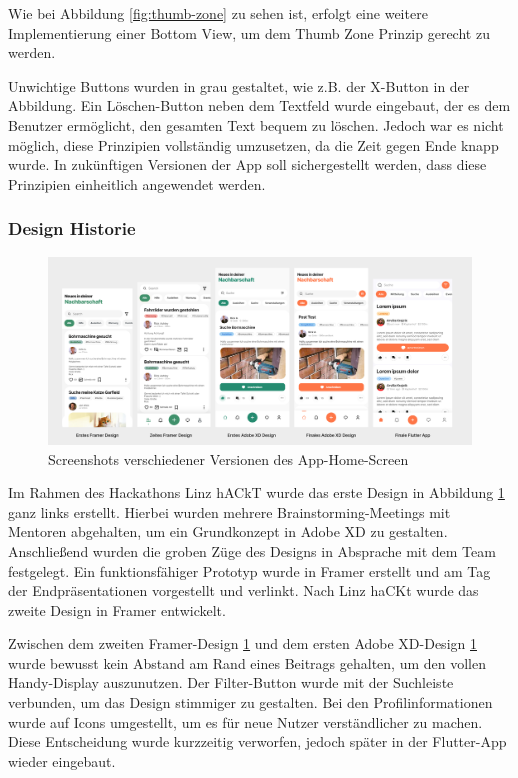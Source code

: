 Wie bei Abbildung \ref{fig:thumb-zone} zu sehen ist, erfolgt eine weitere Implementierung einer Bottom View, um dem Thumb Zone Prinzip gerecht zu werden.

Unwichtige Buttons wurden in grau gestaltet, wie z.B. der X-Button in der Abbildung. Ein Löschen-Button neben dem Textfeld wurde eingebaut, der es dem Benutzer ermöglicht, den gesamten Text bequem zu löschen. Jedoch war es nicht möglich, diese Prinzipien vollständig umzusetzen, da die Zeit gegen Ende knapp wurde. In zukünftigen Versionen der App soll sichergestellt werden, dass diese Prinzipien einheitlich angewendet werden.
\subsubsection{Design Historie}

\begin{figure}[h]
  \centering
  \includegraphics[width=1\textwidth]{pics/app-design-history.png}
  \caption{Screenshots verschiedener Versionen des App-Home-Screen}
  \label{fig:app-design-history}
\end{figure}
Im Rahmen des Hackathons Linz hACkT wurde das erste Design in Abbildung \ref{fig:app-design-history} ganz links erstellt. Hierbei wurden mehrere Brainstorming-Meetings mit Mentoren abgehalten, um ein Grundkonzept in Adobe XD zu gestalten. Anschließend wurden die groben Züge des Designs in Absprache mit dem Team festgelegt. Ein funktionsfähiger Prototyp wurde in Framer erstellt und am Tag der Endpräsentationen vorgestellt und verlinkt. Nach Linz haCKt wurde das zweite Design in Framer entwickelt.

Zwischen dem zweiten Framer-Design
\ref{fig:app-design-history} und dem ersten Adobe XD-Design
\ref{fig:app-design-history} wurde bewusst kein Abstand am
Rand eines Beitrags gehalten, um den vollen Handy-Display
auszunutzen. Der Filter-Button wurde mit der Suchleiste
verbunden, um das Design stimmiger zu gestalten. Bei den
Profilinformationen wurde auf Icons umgestellt, um es für
neue Nutzer verständlicher zu machen. Diese Entscheidung
wurde kurzzeitig verworfen, jedoch später in der Flutter-App
wieder eingebaut.

